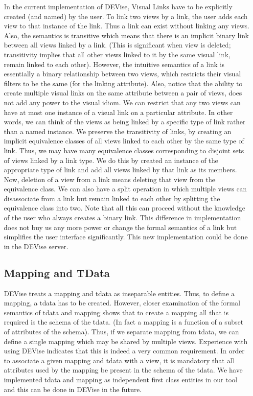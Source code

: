 In the current implementation of DEVise, Visual Links have to be explicitly
created (and named) by the user. To link two views by a link, the user adds
each view to that instance of the link.  Thus a link can exist without
linking any views. Also, the semantics is transitive
which means that there is an implicit binary link between all views linked
by a link. (This is significant when view is deleted; transitivity implies
that all other views linked to it by the same visual link, remain linked to
each other). However, the intuitive semantics of a link is essentially a
binary relationship between two views, which restricts their visual filters to
be the same (for the linking attribute). Also, notice that the ability to
create multiple visual links on the same attribute between a pair of views,
does not add any power to the visual idiom. We can restrict that any two views
can have at most one instance of a visual link on a particular attribute. In 
other words, we can think of the views as being linked by a specific type of
link rather than a named instance.
We preserve the transitivity of links, by creating an implicit equivalence
classes of all views linked to each other by the same type of link.
Thus, we may have many equivalence classes corresponding to disjoint sets
of views linked by a link type.  We do this by created an  instance of the
appropriate type of link and add all views linked by that link as
its members. Now, deletion of a view from a link means deleting that view from
the equivalence class. We can also have a split operation in which multiple
views can disassociate from a link but remain linked to each other by
splitting the equivalence class into two. Note that all this can proceed
without the knowledge of the user who always creates a binary link.
This difference in implementation does not buy us any more power or change the
formal semantics of a link but simplifies the user interface significantly. 
This new implementation could be done in the DEVise server.

\subsection{Mapping and TData}

DEVise treats a mapping and tdata as inseparable entities. Thus, to define a 
mapping, a tdata has to be created. However, closer examination of the
formal semantics of tdata and mapping shows that to create a mapping all
that is required is the schema of the tdata. (In fact a mapping is a function
of a subset of attributes of the schema). Thus, if we separate mapping from
tdata, we can define a single mapping which may be shared by multiple views.
Experience with using DEVise indicates that this is indeed a very common
requirement. In order to associate a given mapping and tdata with a view, 
it is mandatory that all attributes used by the mapping be present in the
schema of the tdata. We have implemented tdata and mapping as independent
first class entities in our tool and this can be done in DEVise in the
future.

